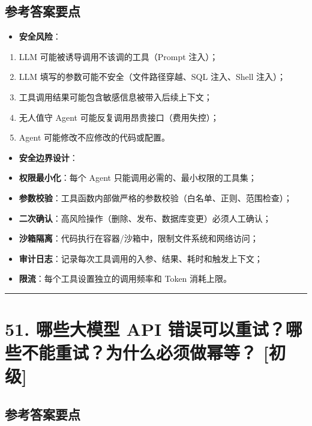 \documentclass[9pt,a4paper,twocolumn]{ctexart}
\newcommand{\lvchu}{\usebox{\badgechubox}}
\def\lvchu{[初级]}%
\begin{document}
\subsection*{参考答案要点}

\begin{itemize}[itemsep=1pt, topsep=2pt]
  \item \textbf{安全风险}：
\end{itemize}
\begin{enumerate}[itemsep=1pt, topsep=2pt]
  \item LLM 可能被诱导调用不该调的工具（Prompt 注入）；
  \item LLM 填写的参数可能不安全（文件路径穿越、SQL 注入、Shell 注入）；
  \item 工具调用结果可能包含敏感信息被带入后续上下文；
  \item 无人值守 Agent 可能反复调用昂贵接口（费用失控）；
  \item Agent 可能修改不应修改的代码或配置。
\end{enumerate}
\begin{itemize}[itemsep=1pt, topsep=2pt]
  \item \textbf{安全边界设计}：
  \item \textbf{权限最小化}：每个 Agent 只能调用必需的、最小权限的工具集；
  \item \textbf{参数校验}：工具函数内部做严格的参数校验（白名单、正则、范围检查）；
  \item \textbf{二次确认}：高风险操作（删除、发布、数据库变更）必须人工确认；
  \item \textbf{沙箱隔离}：代码执行在容器/沙箱中，限制文件系统和网络访问；
  \item \textbf{审计日志}：记录每次工具调用的入参、结果、耗时和触发上下文；
  \item \textbf{限流}：每个工具设置独立的调用频率和 Token 消耗上限。
\end{itemize}


\vspace{2pt}
\noindent\rule{\columnwidth}{0.3pt}\vspace{2pt}



\section*{51. 哪些大模型 API 错误可以重试？哪些不能重试？为什么必须做幂等？ \lvchu{}}


\subsection*{参考答案要点}
\end{document}
